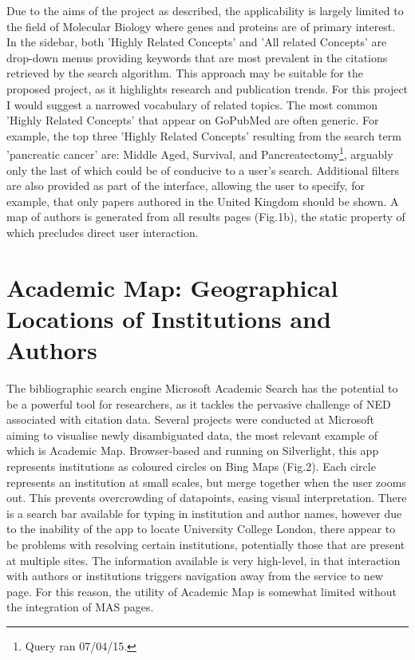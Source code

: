 \documentclass[PROP_AGutteridge_CS.tex]{subfiles}
\begin{document}
\noindent Due to the aims of the project as described\cite{doms}, the applicability is largely limited to the field of Molecular Biology where genes and proteins are of primary interest. In the sidebar, both 'Highly Related Concepts' and 'All related Concepts' are drop-down menus providing keywords that are most prevalent in the citations retrieved by the search algorithm. This approach may be suitable for the proposed project, as it highlights research and publication trends. For this project I would suggest a narrowed vocabulary of related topics. The most common 'Highly Related Concepts' that appear on GoPubMed are often generic. For example, the top three 'Highly Related Concepts' resulting from the search term 'pancreatic cancer' are: Middle Aged, Survival, and Pancreatectomy\footnote{Query ran 07/04/15.}, arguably only the last of which could be of conducive to a user's search. Additional filters are also provided as part of the interface, allowing the user to specify, for example, that only papers authored in the United Kingdom should be shown. A map of authors is generated from all results pages (Fig.1b), the static property of which precludes direct user interaction.

\section{Academic Map: Geographical Locations of Institutions and Authors}
The bibliographic search engine Microsoft Academic Search has the potential to be a powerful tool for researchers, as it tackles the pervasive challenge of NED associated with citation data. Several projects were conducted at Microsoft aiming to visualise newly disambiguated data, the most relevant example of which is Academic Map. Browser-based and running on Silverlight, this app represents institutions as coloured circles on Bing Maps (Fig.2). Each circle represents an institution at small scales, but merge together when the user zooms out. This prevents overcrowding of datapoints, easing visual interpretation. There is a search bar available for typing in institution and author names, however due to the inability of the app to locate University College London, there appear to be problems with resolving certain institutions, potentially those that are present at multiple sites. The information available is very high-level, in that interaction with authors or institutions triggers navigation away from the service to new page. For this reason, the utility of Academic Map is somewhat limited without the integration of MAS pages. 
\end{document}
